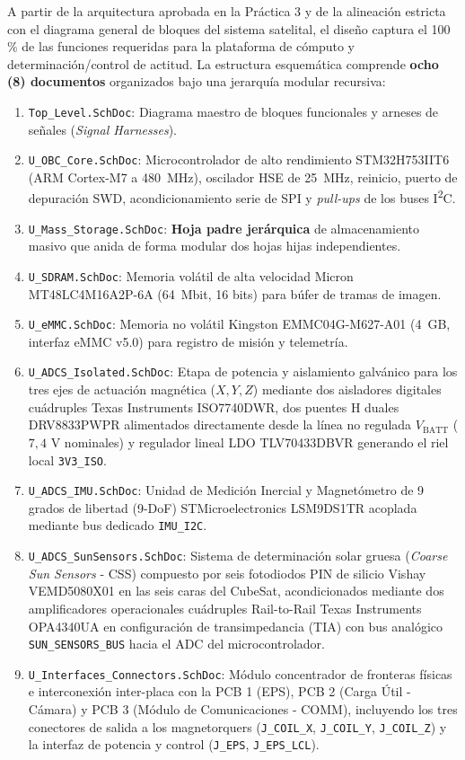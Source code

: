 \documentclass[11pt,a4paper]{article}
\begin{document}
A partir de la arquitectura aprobada en la Práctica 3 y de la alineación estricta con el diagrama general de bloques del sistema satelital, el diseño captura el 100\,\% de las funciones requeridas para la plataforma de cómputo y determinación/control de actitud. La estructura esquemática comprende \textbf{ocho (8) documentos} organizados bajo una jerarquía modular recursiva:
\begin{enumerate}
    \item \texttt{Top\_Level.SchDoc}: Diagrama maestro de bloques funcionales y arneses de señales (\emph{Signal Harnesses}).
    \item \texttt{U\_OBC\_Core.SchDoc}: Microcontrolador de alto rendimiento STM32H753IIT6 (ARM Cortex-M7 a 480~MHz), oscilador HSE de 25~MHz, reinicio, puerto de depuración SWD, acondicionamiento serie de SPI y \emph{pull-ups} de los buses I\textsuperscript{2}C.
    \item \texttt{U\_Mass\_Storage.SchDoc}: \textbf{Hoja padre jerárquica} de almacenamiento masivo que anida de forma modular dos hojas hijas independientes.
    \item \texttt{U\_SDRAM.SchDoc}: Memoria volátil de alta velocidad Micron MT48LC4M16A2P-6A (64~Mbit, 16 bits) para búfer de tramas de imagen.
    \item \texttt{U\_eMMC.SchDoc}: Memoria no volátil Kingston EMMC04G-M627-A01 (4~GB, interfaz eMMC v5.0) para registro de misión y telemetría.
    \item \texttt{U\_ADCS\_Isolated.SchDoc}: Etapa de potencia y aislamiento galvánico para los tres ejes de actuación magnética ($X, Y, Z$) mediante dos aisladores digitales cuádruples Texas Instruments ISO7740DWR, dos puentes H duales DRV8833PWPR alimentados directamente desde la línea no regulada $V_{\text{BATT}}$ ($7{,}4\text{ V}$ nominales) y regulador lineal LDO TLV70433DBVR generando el riel local \texttt{3V3\_ISO}.
    \item \texttt{U\_ADCS\_IMU.SchDoc}: Unidad de Medición Inercial y Magnetómetro de 9 grados de libertad (9-DoF) STMicroelectronics LSM9DS1TR acoplada mediante bus dedicado \texttt{IMU\_I2C}.
    \item \texttt{U\_ADCS\_SunSensors.SchDoc}: Sistema de determinación solar gruesa (\emph{Coarse Sun Sensors} - CSS) compuesto por seis fotodiodos PIN de silicio Vishay VEMD5080X01 en las seis caras del CubeSat, acondicionados mediante dos amplificadores operacionales cuádruples Rail-to-Rail Texas Instruments OPA4340UA en configuración de transimpedancia (TIA) con bus analógico \texttt{SUN\_SENSORS\_BUS} hacia el ADC del microcontrolador.
    \item \texttt{U\_Interfaces\_Connectors.SchDoc}: Módulo concentrador de fronteras físicas e interconexión inter-placa con la PCB 1 (EPS), PCB 2 (Carga Útil - Cámara) y PCB 3 (Módulo de Comunicaciones - COMM), incluyendo los tres conectores de salida a los magnetorquers (\texttt{J\_COIL\_X}, \texttt{J\_COIL\_Y}, \texttt{J\_COIL\_Z}) y la interfaz de potencia y control (\texttt{J\_EPS}, \texttt{J\_EPS\_LCL}).
\end{enumerate}
\end{document}
